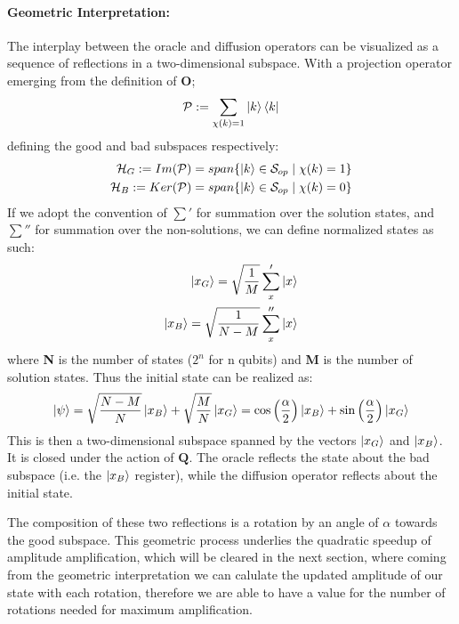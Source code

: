 \documentclass[encoding=utf8,british]{tumphthesis}
\begin{document}
        \paragraph{Geometric Interpretation:}
        The interplay between the oracle and diffusion operators can be visualized as a sequence of reflections in a two-dimensional subspace. 
        With a projection operator emerging from the definition of $\mathbf{O}$;\
        \begin{equation*}
            \mathcal{P} := \sum_{\chi(k) = 1} \left|k\right>\left<k\right|
        \end{equation*} 
        defining the good and bad subspaces respectively:
        \begin{align*}
            \mathcal{H}_G := Im(\mathcal{P}) = span\{ \left|k\right> \in \mathcal{S}_{op} \; | \;\chi(k) = 1\}
            \\
            \mathcal{H}_B := Ker(\mathcal{P}) = span\{ \left|k\right> \in \mathcal{S}_{op} \; | \;\chi(k) = 0\}
        \end{align*} 
        If we adopt the convention of $\sum'$ for summation over the solution states, and $\sum''$ for summation over the non-solutions, we can define normalized states as such:
        \begin{align*}
            \left|x_G\right> = \sqrt{\frac{1}{M}} \sum'_x \left|x\right> 
            \\
            \left|x_B\right> = \sqrt{\frac{1}{N - M}} \sum''_x \left|x\right>
        \end{align*}
        where \textbf{N} is the number of states ($2^n$ for n qubits) and \textbf{M} is the number of solution states. Thus the initial state can be realized as:
        \begin{equation*}
            \left|\psi\right> = \sqrt{\frac{N - M}{N}} \left|x_B\right> + \sqrt{\frac{M}{N}}\left|x_G\right> = \cos\left( \frac{\alpha}{2} \right) \left|x_B\right> + \sin\left( \frac{\alpha}{2} \right)\left|x_G\right>
        \end{equation*} 
        This is then a two-dimensional subspace spanned by the vectors $\left|x_G\right>$ and $\left|x_B\right>$. It is closed under the action of $\mathbf{Q}$.
        The oracle reflects the state about the bad subspace (i.e. the $\left|x_B\right>$ register), while the diffusion operator reflects about the initial state.

        The composition of these two reflections is a rotation by an angle of $\alpha$ towards the good subspace. This geometric process underlies 
        the quadratic speedup of amplitude amplification, which will be cleared in the next section, where coming from the geometric interpretation
        we can calulate the updated amplitude of our state with each rotation, therefore we are able to have a value for the number of rotations needed for 
        maximum amplification.
\end{document}

